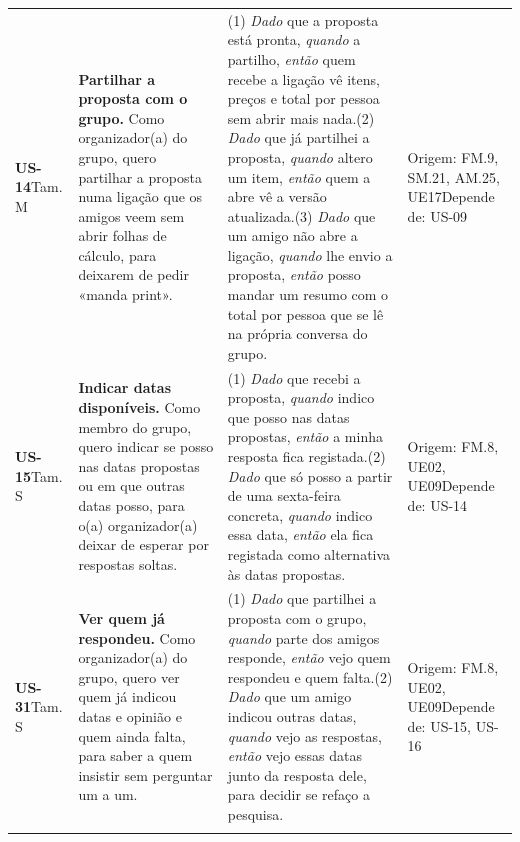 {\begin{longtable}{@{}p{1.5cm}p{5.1cm}p{5.2cm}p{3.6cm}@{}}
\textbf{US-14}\newline Tam. M & \textbf{Partilhar a proposta com o grupo.} Como organizador(a) do grupo, quero partilhar a proposta numa ligação que os amigos veem sem abrir folhas de cálculo, para deixarem de pedir «manda print». & (1) \textit{Dado} que a proposta está pronta, \textit{quando} a partilho, \textit{então} quem recebe a ligação vê itens, preços e total por pessoa sem abrir mais nada.\newline (2) \textit{Dado} que já partilhei a proposta, \textit{quando} altero um item, \textit{então} quem a abre vê a versão atualizada.\newline (3) \textit{Dado} que um amigo não abre a ligação, \textit{quando} lhe envio a proposta, \textit{então} posso mandar um resumo com o total por pessoa que se lê na própria conversa do grupo. & Origem: FM.9, SM.21, AM.25, UE17\newline Depende de: US-09 \\ \addlinespace
\textbf{US-15}\newline Tam. S & \textbf{Indicar datas disponíveis.} Como membro do grupo, quero indicar se posso nas datas propostas ou em que outras datas posso, para o(a) organizador(a) deixar de esperar por respostas soltas. & (1) \textit{Dado} que recebi a proposta, \textit{quando} indico que posso nas datas propostas, \textit{então} a minha resposta fica registada.\newline (2) \textit{Dado} que só posso a partir de uma sexta-feira concreta, \textit{quando} indico essa data, \textit{então} ela fica registada como alternativa às datas propostas. & Origem: FM.8, UE02, UE09\newline Depende de: US-14 \\ \addlinespace
\textbf{US-31}\newline Tam. S & \textbf{Ver quem já respondeu.} Como organizador(a) do grupo, quero ver quem já indicou datas e opinião e quem ainda falta, para saber a quem insistir sem perguntar um a um. & (1) \textit{Dado} que partilhei a proposta com o grupo, \textit{quando} parte dos amigos responde, \textit{então} vejo quem respondeu e quem falta.\newline (2) \textit{Dado} que um amigo indicou outras datas, \textit{quando} vejo as respostas, \textit{então} vejo essas datas junto da resposta dele, para decidir se refaço a pesquisa. & Origem: FM.8, UE02, UE09\newline Depende de: US-15, US-16 \\ \addlinespace

\end{longtable}}
